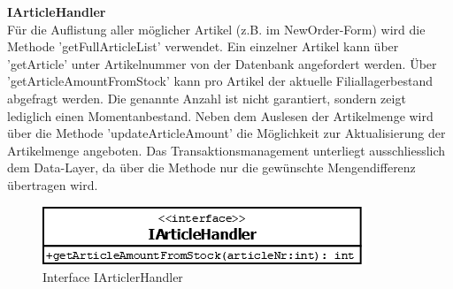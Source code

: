 \textbf{IArticleHandler}\\
Für die Auflistung aller möglicher Artikel (z.B. im NewOrder-Form) wird die Methode 'getFullArticleList' verwendet. Ein einzelner Artikel kann über 'getArticle' unter Artikelnummer von der Datenbank angefordert werden. Über 'getArticleAmountFromStock' kann pro Artikel der aktuelle Filiallagerbestand abgefragt werden. Die genannte Anzahl ist nicht garantiert, sondern zeigt lediglich einen Momentanbestand. Neben dem Auslesen der Artikelmenge wird über die Methode 'updateArticleAmount' die Möglichkeit zur Aktualisierung der Artikelmenge angeboten. Das Transaktionsmanagement unterliegt ausschliesslich dem Data-Layer, da über die Methode nur die gewünschte Mengendifferenz übertragen wird.
\begin{figure}[H]
	\includegraphics[width=0.6\linewidth]{Images/IArticleHandler}
	\caption{Interface IArticlerHandler}
	\label{fig:if-IArticleHandler}
\end{figure}

